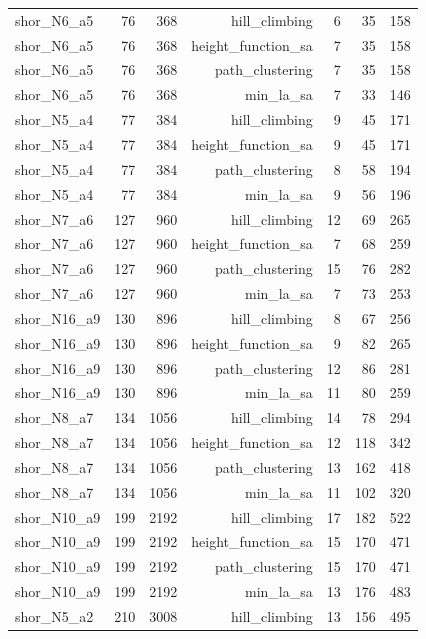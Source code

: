 \begin{longtable}{lrrrrrr}
  shor\_N6\_a5 & 76 & 368 & hill\_climbing & 6 & 35 & 158 \\
  shor\_N6\_a5 & 76 & 368 & height\_function\_sa & 7 & 35 & 158 \\
  shor\_N6\_a5 & 76 & 368 & path\_clustering & 7 & 35 & 158 \\
  shor\_N6\_a5 & 76 & 368 & min\_la\_sa & 7 & 33 & 146 \\
  shor\_N5\_a4 & 77 & 384 & hill\_climbing & 9 & 45 & 171 \\
  shor\_N5\_a4 & 77 & 384 & height\_function\_sa & 9 & 45 & 171 \\
  shor\_N5\_a4 & 77 & 384 & path\_clustering & 8 & 58 & 194 \\
  shor\_N5\_a4 & 77 & 384 & min\_la\_sa & 9 & 56 & 196 \\
  shor\_N7\_a6 & 127 & 960 & hill\_climbing & 12 & 69 & 265 \\
  shor\_N7\_a6 & 127 & 960 & height\_function\_sa & 7 & 68 & 259 \\
  shor\_N7\_a6 & 127 & 960 & path\_clustering & 15 & 76 & 282 \\
  shor\_N7\_a6 & 127 & 960 & min\_la\_sa & 7 & 73 & 253 \\
  shor\_N16\_a9 & 130 & 896 & hill\_climbing & 8 & 67 & 256 \\
  shor\_N16\_a9 & 130 & 896 & height\_function\_sa & 9 & 82 & 265 \\
  shor\_N16\_a9 & 130 & 896 & path\_clustering & 12 & 86 & 281 \\
  shor\_N16\_a9 & 130 & 896 & min\_la\_sa & 11 & 80 & 259 \\
  shor\_N8\_a7 & 134 & 1056 & hill\_climbing & 14 & 78 & 294 \\
  shor\_N8\_a7 & 134 & 1056 & height\_function\_sa & 12 & 118 & 342 \\
  shor\_N8\_a7 & 134 & 1056 & path\_clustering & 13 & 162 & 418 \\
  shor\_N8\_a7 & 134 & 1056 & min\_la\_sa & 11 & 102 & 320 \\
  shor\_N10\_a9 & 199 & 2192 & hill\_climbing & 17 & 182 & 522 \\
  shor\_N10\_a9 & 199 & 2192 & height\_function\_sa & 15 & 170 & 471 \\
  shor\_N10\_a9 & 199 & 2192 & path\_clustering & 15 & 170 & 471 \\
  shor\_N10\_a9 & 199 & 2192 & min\_la\_sa & 13 & 176 & 483 \\
  shor\_N5\_a2 & 210 & 3008 & hill\_climbing & 13 & 156 & 495 \\

\end{longtable}
